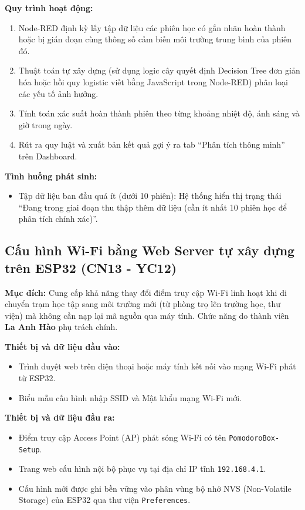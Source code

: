 \textbf{Quy trình hoạt động:}
\begin{enumerate}
    \item Node-RED định kỳ lấy tập dữ liệu các phiên học có gắn nhãn hoàn thành hoặc bị gián đoạn cùng thông số cảm biến môi trường trung bình của phiên đó.
    \item Thuật toán tự xây dựng (sử dụng logic cây quyết định Decision Tree đơn giản hóa hoặc hồi quy logistic viết bằng JavaScript trong Node-RED) phân loại các yếu tố ảnh hưởng.
    \item Tính toán xác suất hoàn thành phiên theo từng khoảng nhiệt độ, ánh sáng và giờ trong ngày.
    \item Rút ra quy luật và xuất bản kết quả gợi ý ra tab ``Phân tích thông minh'' trên Dashboard.
\end{enumerate}

\textbf{Tình huống phát sinh:}
\begin{itemize}
    \item Tập dữ liệu ban đầu quá ít (dưới 10 phiên): Hệ thống hiển thị trạng thái ``Đang trong giai đoạn thu thập thêm dữ liệu (cần ít nhất 10 phiên học để phân tích chính xác)''.
\end{itemize}

\subsection{Cấu hình Wi-Fi bằng Web Server tự xây dựng trên ESP32 (CN13 - YC12)}
\textbf{Mục đích:}
Cung cấp khả năng thay đổi điểm truy cập Wi-Fi linh hoạt khi di chuyển trạm học tập sang môi trường mới (từ phòng trọ lên trường học, thư viện) mà không cần nạp lại mã nguồn qua máy tính. Chức năng do thành viên \textbf{La Anh Hào} phụ trách chính.

\textbf{Thiết bị và dữ liệu đầu vào:}
\begin{itemize}
    \item Trình duyệt web trên điện thoại hoặc máy tính kết nối vào mạng Wi-Fi phát từ ESP32.
    \item Biểu mẫu cấu hình nhập SSID và Mật khẩu mạng Wi-Fi mới.
\end{itemize}

\textbf{Thiết bị và dữ liệu đầu ra:}
\begin{itemize}
    \item Điểm truy cập Access Point (AP) phát sóng Wi-Fi có tên \texttt{PomodoroBox-Setup}.
    \item Trang web cấu hình nội bộ phục vụ tại địa chỉ IP tĩnh \texttt{192.168.4.1}.
    \item Cấu hình mới được ghi bền vững vào phân vùng bộ nhớ NVS (Non-Volatile Storage) của ESP32 qua thư viện \texttt{Preferences}.
\end{itemize}

